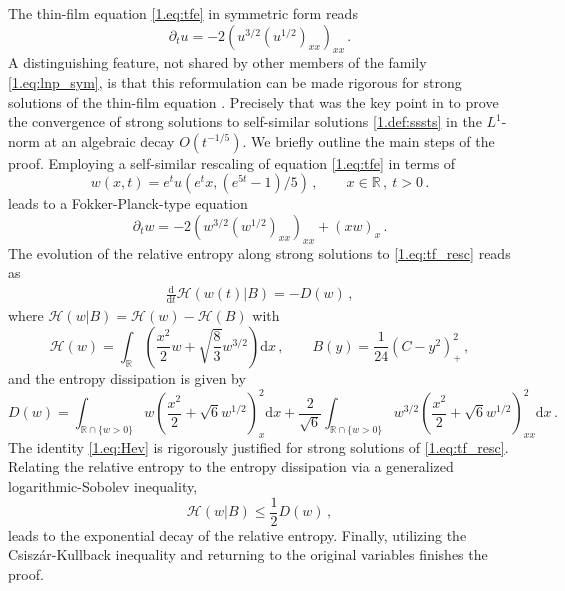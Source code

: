 \documentclass[12pt]{amsart}
\let\pa\partial
\newcommand{\R}{{\mathbb R}}
\newcommand{\dd}{{\mathrm{d}}}
\newcommand{\entropy}{\mathcal{H}}
\theoremstyle{plain}
\theoremstyle{definition}
\theoremstyle{remark}
\begin{document}
The thin-film equation \eqref{1.eq:tfe} in symmetric form reads %
\begin{equation*}%
    \pa_t u = -2\left(u^{3/2}\left(u^{1/2}\right)_{xx}\right)_{xx}\,.%
\end{equation*} 
A distinguishing feature, not shared by other members of the family \eqref{1.eq:lnp_sym}, is that this reformulation can be made rigorous for strong solutions of the thin-film equation \cite{BBD95, BePu96}.
Precisely that was the key point in \cite{CaTo02} to prove the convergence of strong solutions to self-similar solutions \eqref{1.def:sssts} in the $L^1$-norm at an algebraic decay $O(t^{-1/5})$. 
We briefly outline the main steps of the proof. Employing a self-similar rescaling of equation \eqref{1.eq:tfe} in terms of 
\begin{equation} \label{1.def:rescaling1}
    w(x,t) = e^t u(e^tx, (e^{5t}-1)/5)\,,\qquad x\in\R\,,\ t>0\,.
\end{equation}
leads to a Fokker-Planck-type equation
\begin{equation}\label{1.eq:tf_resc}
\pa_t w = -2\left(w^{3/2}\left(w^{1/2}\right)_{xx}\right)_{xx} + (xw)_x\,.    
\end{equation}
The evolution of the relative entropy along strong solutions to \eqref{1.eq:tf_resc} reads as
\begin{align}\label{1.eq:Hev}
    \frac{\dd}{\dd t} \entropy(w(t)|B) = - D(w)\,,
\end{align}
where $\entropy(w|B) = \entropy(w) - \entropy(B)$ with 
\begin{equation*}
    \entropy(w) = \int_{\R}\left(\frac{x^2}{2}w + \sqrt{\frac{8}{3}}w^{3/2}\right)\dd x\,,\qquad B(y) = \frac{1}{24}\left(C - y^2\right)_+^2\,,
\end{equation*}
and the entropy dissipation is given by
\begin{equation*}
    D(w) = \int_{\R\cap \{w>0\}} w\left(\frac{x^2}{2} + \sqrt{6}w^{1/2}\right)_x^2\dd x + \frac{2}{\sqrt{6}}\int_{\R\cap \{w>0\}} w^{3/2}\left(\frac{x^2}{2} + \sqrt{6}w^{1/2}\right)_{xx}^2\dd x\,.
\end{equation*}
The identity \eqref{1.eq:Hev} is rigorously justified for strong solutions of \eqref{1.eq:tf_resc}. Relating the relative entropy to the entropy dissipation via a generalized logarithmic-Sobolev inequality,
\begin{equation*}
    \entropy(w|B) \leq \frac{1}{2}D(w)\,,
\end{equation*}
leads to the exponential decay of the relative entropy. Finally, utilizing the Csisz\'ar-Kullback inequality \cite{CJMTU01} and returning to the original variables finishes the proof. 
\end{document}
